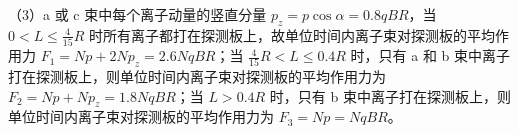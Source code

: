 \documentclass[\gkver]{gaokaozhenti}
\begin{document}
\begin{enumerate}
{（3）a 或 c 束中每个离子动量的竖直分量 $p_{z}=p\cos\alpha=0.8qBR$，当 $0<L\leq\frac{4}{15}R$ 时所有离子都打在探测板上，故单位时间内离子束对探测板的平均作用力 $F_{1}=Np+2Np_{z}=2.6NqBR$；当 $\frac{4}{15}R<L\leq0.4R$ 时，只有 a 和 b 束中离子打在探测板上，则单位时间内离子束对探测板的平均作用力为 $F_{2}=Np+Np_{z}=1.8NqBR$；当 $L>0.4R$ 时，只有 b 束中离子打在探测板上，则单位时间内离子束对探测板的平均作用力为 $F_{3}=Np=NqBR$。

}

\end{enumerate}
\end{document}
